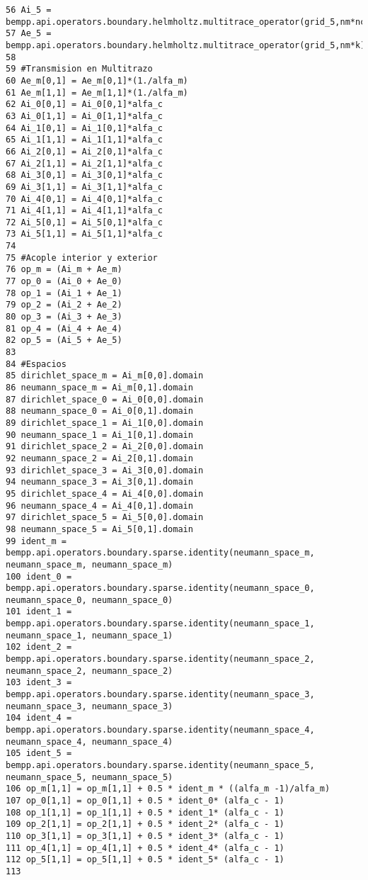 \documentclass[12pt,letterpaper]{article}
\numberwithin{equation}{section}
\begin{document}
\begin{lstlisting}
56 Ai_5 = bempp.api.operators.boundary.helmholtz.multitrace_operator(grid_5,nm*nc*k)
57 Ae_5 = bempp.api.operators.boundary.helmholtz.multitrace_operator(grid_5,nm*k)
58 
59 #Transmision en Multitrazo
60 Ae_m[0,1] = Ae_m[0,1]*(1./alfa_m)
61 Ae_m[1,1] = Ae_m[1,1]*(1./alfa_m)
62 Ai_0[0,1] = Ai_0[0,1]*alfa_c
63 Ai_0[1,1] = Ai_0[1,1]*alfa_c
64 Ai_1[0,1] = Ai_1[0,1]*alfa_c
65 Ai_1[1,1] = Ai_1[1,1]*alfa_c
66 Ai_2[0,1] = Ai_2[0,1]*alfa_c
67 Ai_2[1,1] = Ai_2[1,1]*alfa_c
68 Ai_3[0,1] = Ai_3[0,1]*alfa_c
69 Ai_3[1,1] = Ai_3[1,1]*alfa_c
70 Ai_4[0,1] = Ai_4[0,1]*alfa_c
71 Ai_4[1,1] = Ai_4[1,1]*alfa_c
72 Ai_5[0,1] = Ai_5[0,1]*alfa_c
73 Ai_5[1,1] = Ai_5[1,1]*alfa_c
74 
75 #Acople interior y exterior
76 op_m = (Ai_m + Ae_m)
77 op_0 = (Ai_0 + Ae_0)
78 op_1 = (Ai_1 + Ae_1)
79 op_2 = (Ai_2 + Ae_2)
80 op_3 = (Ai_3 + Ae_3)
81 op_4 = (Ai_4 + Ae_4)
82 op_5 = (Ai_5 + Ae_5)
83 
84 #Espacios
85 dirichlet_space_m = Ai_m[0,0].domain
86 neumann_space_m = Ai_m[0,1].domain
87 dirichlet_space_0 = Ai_0[0,0].domain
88 neumann_space_0 = Ai_0[0,1].domain
89 dirichlet_space_1 = Ai_1[0,0].domain
90 neumann_space_1 = Ai_1[0,1].domain
91 dirichlet_space_2 = Ai_2[0,0].domain
92 neumann_space_2 = Ai_2[0,1].domain
93 dirichlet_space_3 = Ai_3[0,0].domain
94 neumann_space_3 = Ai_3[0,1].domain
95 dirichlet_space_4 = Ai_4[0,0].domain
96 neumann_space_4 = Ai_4[0,1].domain
97 dirichlet_space_5 = Ai_5[0,0].domain
98 neumann_space_5 = Ai_5[0,1].domain
99 ident_m = bempp.api.operators.boundary.sparse.identity(neumann_space_m, neumann_space_m, neumann_space_m)
100 ident_0 = bempp.api.operators.boundary.sparse.identity(neumann_space_0, neumann_space_0, neumann_space_0)
101 ident_1 = bempp.api.operators.boundary.sparse.identity(neumann_space_1, neumann_space_1, neumann_space_1)
102 ident_2 = bempp.api.operators.boundary.sparse.identity(neumann_space_2, neumann_space_2, neumann_space_2)
103 ident_3 = bempp.api.operators.boundary.sparse.identity(neumann_space_3, neumann_space_3, neumann_space_3)
104 ident_4 = bempp.api.operators.boundary.sparse.identity(neumann_space_4, neumann_space_4, neumann_space_4)
105 ident_5 = bempp.api.operators.boundary.sparse.identity(neumann_space_5, neumann_space_5, neumann_space_5)
106 op_m[1,1] = op_m[1,1] + 0.5 * ident_m * ((alfa_m -1)/alfa_m)
107 op_0[1,1] = op_0[1,1] + 0.5 * ident_0* (alfa_c - 1)
108 op_1[1,1] = op_1[1,1] + 0.5 * ident_1* (alfa_c - 1)
109 op_2[1,1] = op_2[1,1] + 0.5 * ident_2* (alfa_c - 1)
110 op_3[1,1] = op_3[1,1] + 0.5 * ident_3* (alfa_c - 1)
111 op_4[1,1] = op_4[1,1] + 0.5 * ident_4* (alfa_c - 1)
112 op_5[1,1] = op_5[1,1] + 0.5 * ident_5* (alfa_c - 1)
113 

\end{lstlisting}
\end{document}
